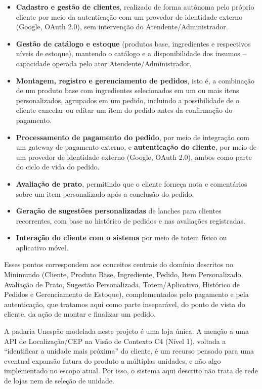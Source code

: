 \documentclass[a4paper,12pt,oneside,openany]{book}
\begin{document}
\begin{itemize}
    \item \textbf{Cadastro e gestão de clientes}, realizado de forma autônoma pelo próprio cliente por meio da autenticação com um provedor de identidade externo (Google, OAuth 2.0), sem intervenção do Atendente/Administrador.
    \item \textbf{Gestão de catálogo e estoque} (produtos base, ingredientes e respectivos níveis de estoque), mantendo o catálogo e a disponibilidade dos insumos -- capacidade operada pelo ator Atendente/Administrador.
    \item \textbf{Montagem, registro e gerenciamento de pedidos}, isto é, a combinação de um produto base com ingredientes selecionados em um ou mais itens personalizados, agrupados em um pedido, incluindo a possibilidade de o cliente cancelar ou editar um item do pedido antes da confirmação do pagamento.
    \item \textbf{Processamento de pagamento do pedido}, por meio de integração com um gateway de pagamento externo, e \textbf{autenticação do cliente}, por meio de um provedor de identidade externo (Google, OAuth 2.0), ambos como parte do ciclo de vida do pedido.
    \item \textbf{Avaliação de prato}, permitindo que o cliente forneça nota e comentários sobre um item personalizado após a conclusão do pedido.
    \item \textbf{Geração de sugestões personalizadas} de lanches para clientes recorrentes, com base no histórico de pedidos e nas avaliações registradas.
    \item \textbf{Interação do cliente com o sistema} por meio de totem físico ou aplicativo móvel.
\end{itemize}

Esses pontos correspondem aos conceitos centrais do domínio descritos no Minimundo (Cliente, Produto Base, Ingrediente, Pedido, Item Personalizado, Avaliação de Prato, Sugestão Personalizada, Totem/Aplicativo, Histórico de Pedidos e Gerenciamento de Estoque), complementados pelo pagamento e pela autenticação, que tratamos aqui como parte inseparável, do ponto de vista do cliente, da ação de montar e finalizar um pedido.

A padaria Unespão modelada neste projeto é uma loja única. A menção a uma API de Localização/CEP na Visão de Contexto C4 (Nível 1), voltada a ``identificar a unidade mais próxima'' do cliente, é um recurso pensado para uma eventual expansão futura do produto a múltiplas unidades, e não algo implementado no escopo atual. Por isso, o sistema aqui descrito não trata de rede de lojas nem de seleção de unidade.
\end{document}
